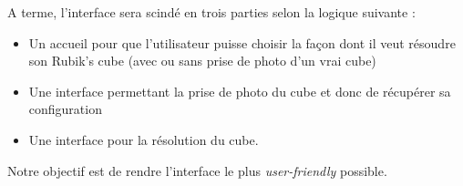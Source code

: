 A terme, l'interface sera scindé en trois parties selon la logique suivante :

\begin{itemize}
    \item Un accueil pour que l'utilisateur puisse choisir la façon dont il veut résoudre son Rubik's cube (avec ou sans prise de photo d'un vrai cube)
    \item Une interface permettant la prise de photo du cube et donc de récupérer sa configuration 
    \item Une interface pour la résolution du cube.
\end{itemize}
Notre objectif est de rendre l'interface le plus \textit{user-friendly} possible.



